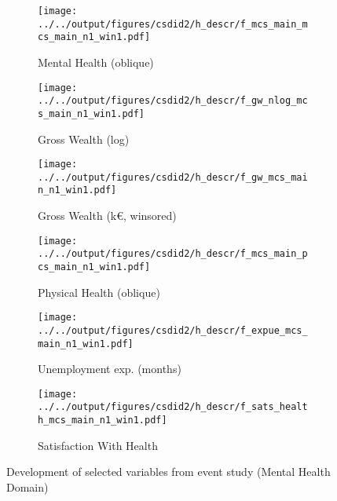 \begin{figure}[htb!]
    \centering \setcounter{subfigure}{0}%
    \begin{subfigure}{0.32\textwidth}
        \caption{Mental Health (oblique)}
        \texttt{[image: ../../output/figures/csdid2/h\_descr/f\_mcs\_main\_mcs\_main\_n1\_win1.pdf]}
        \label{sfig:fmcsmainmcsmain}
    \end{subfigure}
    \begin{subfigure}{0.32\textwidth}
        \caption{Gross Wealth (log)}
        \texttt{[image: ../../output/figures/csdid2/h\_descr/f\_gw\_nlog\_mcs\_main\_n1\_win1.pdf]}
        \label{sfig:fgwnlogmcsmain}
    \end{subfigure}
    \begin{subfigure}{0.32\textwidth}
        \caption{Gross Wealth (k€, winsored)}
        \texttt{[image: ../../output/figures/csdid2/h\_descr/f\_gw\_mcs\_main\_n1\_win1.pdf]}
        \label{sfig:fgwmcsmain}
    \end{subfigure}
    \begin{subfigure}{0.32\textwidth}
        \caption{Physical Health (oblique)}
        \texttt{[image: ../../output/figures/csdid2/h\_descr/f\_mcs\_main\_pcs\_main\_n1\_win1.pdf]}
        \label{sfig:fmcsmainpcsmain}
    \end{subfigure}
    \begin{subfigure}{0.32\textwidth}
        \caption{Unemployment exp. (months)}
        \texttt{[image: ../../output/figures/csdid2/h\_descr/f\_expue\_mcs\_main\_n1\_win1.pdf]}
        \label{sfig:fexpuemcsmain}
    \end{subfigure}
    \begin{subfigure}{0.32\textwidth}
        \caption{Satisfaction With Health}
        \texttt{[image: ../../output/figures/csdid2/h\_descr/f\_sats\_health\_mcs\_main\_n1\_win1.pdf]}
        \label{sfig:fsatshealthmcsmain}
    \end{subfigure}
    \caption{Development of selected variables from event study (Mental Health Domain)}
    \label{fig:inlevelsmcsmain}
\end{figure}



